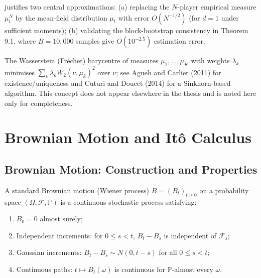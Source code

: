 \begin{remark}
 justifies two central approximations: (a) replacing the
$N$-player empirical measure $\mu_t^N$ by the mean-field distribution $\mu_t$ with
error $O(N^{-1/2})$ (for $d=1$ under sufficient moments); (b) validating the
block-bootstrap consistency in Theorem 9.1, where $B = 10{,}000$ samples give
$O(10^{-2.5})$ estimation error.
\end{remark}

\begin{remark}
The Wasserstein (Fr\'echet) barycentre of measures $\mu_1,\ldots,\mu_K$ with
weights $\lambda_k$ minimises $\sum_k \lambda_k W_2(\nu,\mu_k)^2$ over $\nu$;
see Agueh and Carlier (2011) for existence/uniqueness and Cuturi and Doucet
(2014) for a Sinkhorn-based algorithm. This concept does not appear elsewhere
in the thesis and is noted here only for completeness.
\end{remark}


\section{Brownian Motion and It\^o Calculus}
\label{sec:mp-ito-calculus}

\subsection{Brownian Motion: Construction and Properties}

\begin{definition}
A standard Brownian motion (Wiener process) $B = (B_t)_{t \geq 0}$ on a probability
space $(\Omega, \mathcal{F}, \mathbb{P})$ is a continuous stochastic process satisfying:
\begin{enumerate}[label=(\roman*)]
    \item $B_0 = 0$ almost surely;
    \item Independent increments: for $0 \leq s < t$, $B_t - B_s$ is independent of
    $\mathcal{F}_s$;
    \item Gaussian increments: $B_t - B_s \sim N(0, t-s)$ for all $0 \leq s < t$;
    \item Continuous paths: $t \mapsto B_t(\omega)$ is continuous for
    $\mathbb{P}$-almost every $\omega$.
\end{enumerate}
\end{definition}

